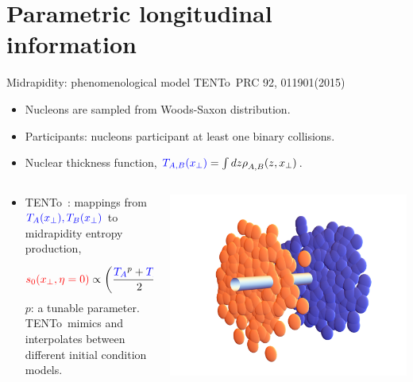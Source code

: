 \documentclass[11pt]{beamer}
\newcommand{\TRENTo}{T\raisebox{-0.2em}{R}ENTo~}
\begin{document}
\section{Parametric longitudinal information}
\begin{frame}{Midrapidity: phenomenological model \TRENTo \tiny PRC 92, 011901(2015)}
\begin{itemize}
\item Nucleons are sampled from Woods-Saxon distribution.
\item Participants: nucleons participant at least one binary collisions.
\item Nuclear thickness function, ${\color{blue} T_{A, B}(x_\perp)} = \int dz \rho_{A, B}^{}(z, x_\perp)$.
\end{itemize}

\begin{columns}
\begin{column}{0.65\textwidth}
\begin{itemize}
\item \TRENTo: mappings from ${\color{blue} T_A(x_\perp), T_B(x_\perp)}$ to midrapidity {\color{red} entropy production},
\begin{eqnarray}
\nonumber
{\color{red} s_0(x_\perp, \eta=0)} \propto \left(\frac{{\color{blue} T_A}^p + {\color{blue} T_B}^p}{2}\right)^{1/p}.
\end{eqnarray}
$p$: a tunable parameter. \TRENTo mimics and interpolates between different initial condition models.
\end{itemize}
\end{column}
\begin{column}{0.35\textwidth}
\includegraphics[width=\textwidth]{overlap_3.pdf}\\

\end{column}
\end{columns}
\end{frame}
\end{document}
